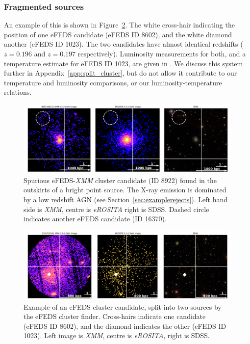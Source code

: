 \documentclass[fleqn,usenatbib]{mnras}
\begin{document}
\subsubsection{Fragmented sources}
\label{subsubsec:frag}

An example of this is shown in Figure~\ref{fig:splitcluster}. The white cross-hair indicating the position of one eFEDS candidate (eFEDS ID 8602), and the white diamond another (eFEDS ID 1023). The two candidates have almost identical redshifts ($z=0.196$ and $z=0.197$ respectively). Luminosity measurements for both, and a temperature estimate for eFEDS ID 1023, are given in \cite{efedsclustercat}. We discuss this system further in Appendix~\ref{app:split_cluster}, but do not allow it contribute to our temperature and luminosity comparisons, or our luminosity-temperature relations.


\begin{figure}
    \centering
    \includegraphics[width=1\textwidth]{images/outskirt_cands.png}
    \caption[]{Spurious eFEDS-{\em XMM} cluster candidate (ID 8922) found in the outskirts of a bright point source.  The X-ray emission is dominated by a low redshift AGN (see Section~\ref{sec:examplerejects}). Left hand side is {\em XMM}, centre is {\em eROSITA} right is SDSS. Dashed circle indicates another eFEDS candidate (ID 16370).}
    \label{fig:brightoutskirts}
\end{figure}

\begin{figure}
    \centering
    \includegraphics[width=1\textwidth]{images/split_cluster.png}
    \caption[]{Example of an eFEDS cluster candidate, split into two sources by the eFEDS cluster finder. Cross-hairs indicate one candidate (eFEDS ID 8602), and the diamond indicates the other (eFEDS ID 1023). Left image is {\em XMM}, centre is {\em eROSITA}, right is SDSS.}
    \label{fig:splitcluster}
\end{figure}
\end{document}
